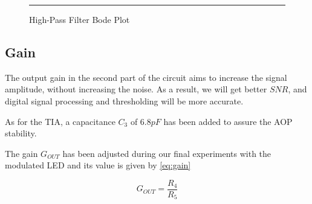 \begin{figure}[htbp]
    \centering
    \rule{35em}{0.5pt}
    \caption{High-Pass Filter Bode Plot}
    \label{fig:hpf-bode}
\end{figure}
\subsection{Gain}


The output gain in the second part of the circuit aims to increase the signal amplitude, without increasing the noise. As a result, we will get better $SNR$, and digital signal processing and thresholding will be more accurate.

As for the TIA, a capacitance $C_3$ of $6.8pF$ has been added to assure the AOP stability.

The gain $G_{OUT}$ has been adjusted during our final experiments with the modulated LED and its value is given by \ref{eq:gain}

\begin{equation}
G_{OUT}  = \frac{R_{4}}{R_{5}}
\label{eq:gain}
\end{equation}


